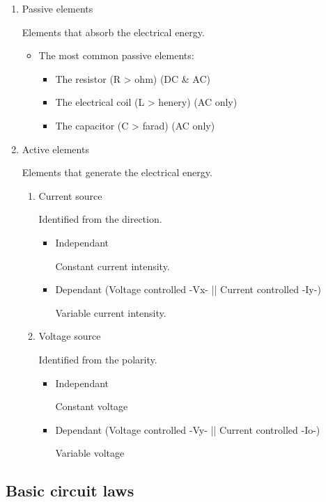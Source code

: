 \documentclass[11pt]{article}
\begin{document}
\begin{enumerate}
\item Passive elements

Elements that absorb the electrical energy.

\begin{itemize}
\item The most common passive elements:

\begin{itemize}
\item The resistor        (R > ohm)    (DC \& AC)
\item The electrical coil (L > henery) (AC only)
\item The capacitor       (C > farad)  (AC only)
\end{itemize}
\end{itemize}

\item Active elements

Elements that generate the electrical energy.

\begin{enumerate}
\item Current source

Identified from the direction.

\begin{itemize}
\item Independant

Constant current intensity.

\item Dependant (Voltage controlled -Vx- || Current controlled -Iy-)

Variable current intensity.
\end{itemize}

\item Voltage source

Identified from the polarity.

\begin{itemize}
\item Independant

Constant voltage

\item Dependant (Voltage controlled -Vy- || Current controlled -Io-) 

Variable voltage
\end{itemize}
\end{enumerate}
\end{enumerate}
\subsection{Basic circuit laws}
\label{sec:orgec8564e}
\end{document}
